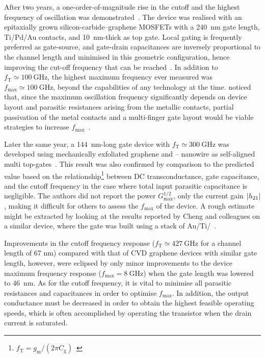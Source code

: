 After two years, a one-order-of-magnitude rise in the cutoff and the highest frequency of oscillation was demonstrated~\cite{lin2010100}. The device was realised with an epitaxially grown silicon-carbide--graphene \glspl{MOSFET} with a \SI{240}{\nano\metre} gate length, Ti/Pd/Au contacts, and  \SI{10}{\nano\metre}-thick as top gate. Local gating is frequently preferred as gate-source, and gate-drain capacitances are inversely proportional to the channel length and minimised in this geometric configuration, hence improving the cut-off frequency that can be reached~\cite{liao2012graphene}. In addition to $f_\textrm{T}\simeq\SI{100}{\giga\hertz}$, the highest maximum frequency ever measured was $f_\textrm{max}\simeq\SI{100}{\giga\hertz}$, beyond the capabilities of any technology at the time. \citeauthor{xu2016contacts} noticed that, since the maximum oscillation frequency significantly depends on  device layout and parasitic resistances arising from the metallic contacts, partial passivation of the metal contacts and a multi-finger gate layout would be viable strategies to increase $f_\textrm{max}$~\cite{xu2016contacts}.

Later the same year, a \SI{144}{\nano\metre}-long gate device with $f_\textrm{T}\simeq\SI{300}{\giga\hertz}$ was developed using mechanically exfoliated graphene and – nanowire as self-aligned multi top-gates~\cite{liao2010high}. This result was also confirmed by comparison to the predicted value based on the relationship\footnote[2]{$f_\textrm{T} = g_\textrm{m}/(2\pi C_\textrm{g})$~\cite{sze2021physics}}  between \gls{DC} transconductance, gate capacitance, and the cutoff frequency in the case where total input parasitic capacitance is negligible. The authors did not report the power $G^{1/2}_\textrm{max}$, only the current gain $\abs{h_{21}}$, making it difficult for others to assess the $f_\textrm{max}$ of the device. A rough estimate might be extracted by looking at the results reported by Cheng and colleagues on a similar device, where the gate was built using a stack of Au/Ti/~\cite{cheng2012high}.

Improvements in the cutoff frequency response ($f_\textrm{T}\simeq\SI{427}{\giga\hertz}$ for a channel length of 67 nm) compared with that of \gls{CVD} graphene devices with similar gate length, however, were eclipsed by only minor improvements to the device maximum frequency response ($f_\textrm{max}=\SI{8}{\giga\hertz}$) when the gate length was lowered to \SI{46}{\nano\metre}. As for the cutoff frequency, it is vital to minimise all parasitic resistances and capacitances in order to optimise $f_\textrm{max}$. In addition, the output conductance must be decreased in order to obtain the highest feasible operating speeds, which is often accomplished by operating the transistor when the drain current is saturated.

